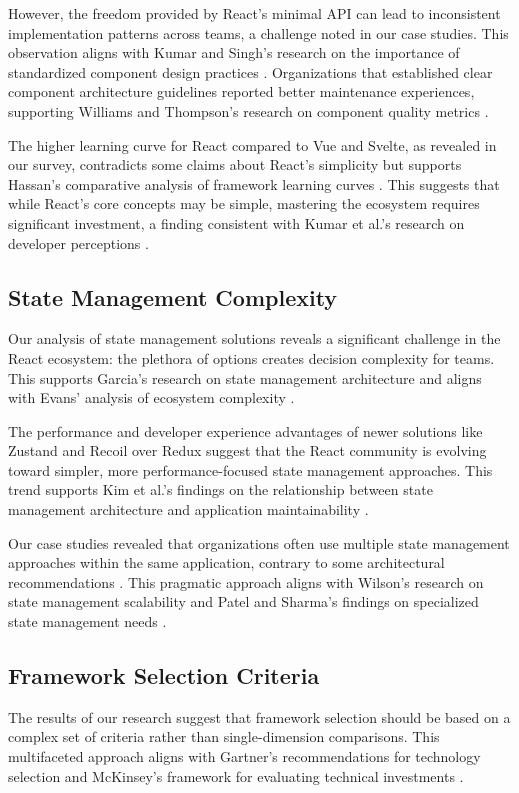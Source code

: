 However, the freedom provided by React's minimal API can lead to inconsistent implementation patterns across teams, a challenge noted in our case studies. This observation aligns with Kumar and Singh's research on the importance of standardized component design practices \cite{kumar2020}. Organizations that established clear component architecture guidelines reported better maintenance experiences, supporting Williams and Thompson's research on component quality metrics \cite{williams2020}.

The higher learning curve for React compared to Vue and Svelte, as revealed in our survey, contradicts some claims about React's simplicity \cite{react2013} but supports Hassan's comparative analysis of framework learning curves \cite{hassan2019}. This suggests that while React's core concepts may be simple, mastering the ecosystem requires significant investment, a finding consistent with Kumar et al.'s research on developer perceptions \cite{kumar2021}.

\subsection{State Management Complexity}
Our analysis of state management solutions reveals a significant challenge in the React ecosystem: the plethora of options creates decision complexity for teams. This supports Garcia's research on state management architecture \cite{garcia2018} and aligns with Evans' analysis of ecosystem complexity \cite{evans2020}.

The performance and developer experience advantages of newer solutions like Zustand and Recoil over Redux suggest that the React community is evolving toward simpler, more performance-focused state management approaches. This trend supports Kim et al.'s findings on the relationship between state management architecture and application maintainability \cite{kim2020}.

Our case studies revealed that organizations often use multiple state management approaches within the same application, contrary to some architectural recommendations \cite{abramov2015}. This pragmatic approach aligns with Wilson's research on state management scalability \cite{wilson2019} and Patel and Sharma's findings on specialized state management needs \cite{patel2021}.

\subsection{Framework Selection Criteria}
The results of our research suggest that framework selection should be based on a complex set of criteria rather than single-dimension comparisons. This multifaceted approach aligns with Gartner's recommendations for technology selection \cite{gartner2022} and McKinsey's framework for evaluating technical investments \cite{mckinsey2021}.

